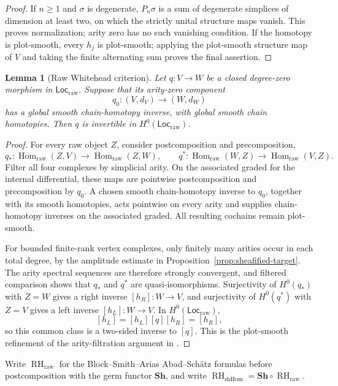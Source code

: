 \documentclass[12pt]{amsart}
\newtheorem{lem}[thm]{Lemma}
\theoremstyle{definition}
\theoremstyle{remark}
\numberwithin{equation}{section}
\newcommand{\1}{{\mathbb{1}}}
\newcommand{\Loc}{\mathsf{Loc}}
\newcommand{\RH}{\operatorname{RH}}
\newcommand{\Hom}{\operatorname{Hom}}
\begin{document}
\begin{proof}
If $n\geq1$ and $\sigma$ is degenerate, $P_n\sigma$ is a sum of
degenerate simplices of dimension at least two, on which the strictly
unital structure maps vanish.  This proves normalization; arity zero
has no such vanishing condition.
If the homotopy is plot-smooth, every $h_j$ is plot-smooth; applying
the plot-smooth structure map of $V$ and taking the finite alternating
sum proves the final assertion.
\end{proof}

\begin{lem}[Raw Whitehead criterion]\label{lem:raw-whitehead}
Let $q:V\to W$ be a closed degree-zero morphism in
$\Loc_{\mathrm{raw}}$.  Suppose that its arity-zero component
\[
 q_0:(V,d_V)\longrightarrow(W,d_W)
\]
has a global smooth chain-homotopy inverse, with global smooth chain
homotopies.  Then $q$ is invertible in
$H^0(\Loc_{\mathrm{raw}})$.
\end{lem}

\begin{proof}
For every raw object $Z$, consider postcomposition and
precomposition,
\[
 q_*:\Hom_{\mathrm{raw}}(Z,V)\longrightarrow
      \Hom_{\mathrm{raw}}(Z,W),
 \qquad
 q^*:\Hom_{\mathrm{raw}}(W,Z)\longrightarrow
      \Hom_{\mathrm{raw}}(V,Z).
\]
Filter all four complexes by simplicial arity.  On the associated
graded for the internal differential, these maps are pointwise
postcomposition and precomposition by $q_0$.  A chosen smooth
chain-homotopy inverse to $q_0$, together with its smooth
homotopies, acts pointwise on every arity and supplies
chain-homotopy inverses on the associated graded.  All resulting
cochains remain plot-smooth.

For bounded finite-rank vertex complexes, only finitely many arities
occur in each total degree, by the amplitude estimate in
Proposition~\ref{prop:sheafified-target}.  The arity spectral
sequences are therefore strongly convergent, and filtered comparison
shows that $q_*$ and $q^*$ are quasi-isomorphisms.  Surjectivity of
$H^0(q_*)$ with $Z=W$ gives a right inverse
$[h_R]:W\to V$, and surjectivity of $H^0(q^*)$ with $Z=V$ gives a
left inverse $[h_L]:W\to V$.  In $H^0(\Loc_{\mathrm{raw}})$,
\[
 [h_L]
 =[h_L][q][h_R]
 =[h_R],
\]
so this common class is a two-sided inverse to $[q]$.  This is the
plot-smooth refinement of the arity-filtration argument in
\cite[Propositions 2.5 and 2.7]{BS14}.
\end{proof}

Write $\RH_{\mathrm{raw}}$ for the Block--Smith--Arias
Abad--Sch\"atz formulas before postcomposition with the germ functor
$\mathbf{Sh}$, and write
$\RH_{\mathrm{shHom}}=\mathbf{Sh}\circ\RH_{\mathrm{raw}}$.
\end{document}
